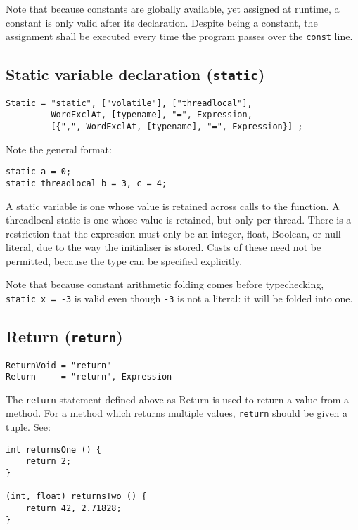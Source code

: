 \documentclass{article}
\begin{document}
Note that because constants are globally available, yet assigned at runtime, a
constant is only valid after its declaration. Despite being a constant, the
assignment shall be executed every time the program passes over the \texttt{const}
line.

\subsection{Static variable declaration (\texttt{static})}
\label{sub:statements:static}
\begin{verbatim}
Static = "static", ["volatile"], ["threadlocal"],
         WordExclAt, [typename], "=", Expression,
         [{",", WordExclAt, [typename], "=", Expression}] ;
\end{verbatim}

Note the general format:
\begin{verbatim}
static a = 0;
static threadlocal b = 3, c = 4;
\end{verbatim}

A static variable is one whose value is retained across calls to the function.
A threadlocal static is one whose value is retained, but only per thread.
There is a restriction that the expression must only be an integer, float,
Boolean, or null literal, due to the way the initialiser is stored. Casts of
these need not be permitted, because the type can be specified explicitly.

Note that because constant arithmetic folding comes before typechecking,
\texttt{static~x~=~-3} is valid even though \texttt{-3} is not a literal: it
will be folded into one.

\subsection{Return (\texttt{return})}
\label{sub:statements:return}
\begin{verbatim}
ReturnVoid = "return"
Return     = "return", Expression
\end{verbatim}

The \texttt{return} statement defined above as Return is used to return a
value from a method. For a method which returns multiple values,
\texttt{return} should be given a tuple. See:
\begin{verbatim}
int returnsOne () {
    return 2;
}

(int, float) returnsTwo () {
    return 42, 2.71828;
}
\end{verbatim}
\end{document}
